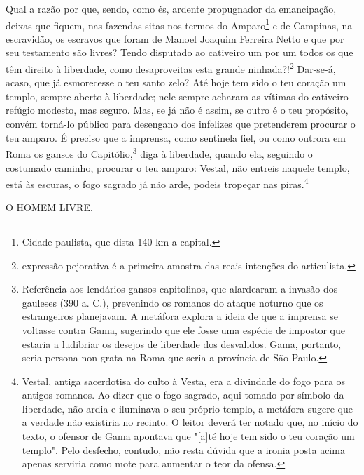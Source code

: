Qual a razão por que, sendo, como és, ardente propugnador da
emancipação, deixas que fiquem, nas fazendas sitas nos termos do
Amparo\footnote{Cidade paulista, que dista 140 km a capital.} e de
Campinas, na escravidão, os escravos que foram de Manoel Joaquim
Ferreira Netto e que por seu testamento são livres? Tendo disputado ao
cativeiro um por um todos os que têm direito à liberdade, como
desaproveitas esta grande ninhada?!\footnote{expressão pejorativa é
  a primeira amostra das reais intenções do articulista.} Dar-se-á,
acaso, que já esmorecesse o teu santo zelo? Até hoje tem sido o teu
coração um templo, sempre aberto à liberdade; nele sempre acharam as
vítimas do cativeiro refúgio modesto, mas seguro. Mas, se já não é
assim, se outro é o teu propósito, convém torná-lo público para
desengano dos infelizes que pretenderem procurar o teu amparo. É preciso
que a imprensa, como sentinela fiel, ou como outrora em Roma os gansos
do Capitólio,\footnote{Referência aos lendários gansos capitolinos,
  que alardearam a invasão dos gauleses (390 a. C.), prevenindo os
  romanos do ataque noturno que os estrangeiros planejavam. A metáfora
  explora a ideia de que a imprensa se voltasse contra Gama, sugerindo
  que ele fosse uma espécie de impostor que estaria a ludibriar os
  desejos de liberdade dos desvalidos. Gama, portanto, seria persona non
  grata na Roma que seria a província de São Paulo.} diga à liberdade,
quando ela, seguindo o costumado caminho, procurar o teu amparo: Vestal,
não entreis naquele templo, está às escuras, o fogo sagrado já não arde,
podeis tropeçar nas piras.\footnote{Vestal, antiga sacerdotisa do
  culto à Vesta, era a divindade do fogo para os antigos romanos. Ao
  dizer que o fogo sagrado, aqui tomado por símbolo da liberdade, não
  ardia e iluminava o seu próprio templo, a metáfora sugere que a
  verdade não existiria no recinto. O leitor deverá ter notado que, no
  início do texto, o ofensor de Gama apontava que "{[}a{]}té hoje tem
  sido o teu coração um templo". Pelo desfecho, contudo, não resta
  dúvida que a ironia posta acima apenas serviria como mote para
  aumentar o teor da ofensa.}

O HOMEM LIVRE.

\pagebreak
\mbox{}\vfill
\thispagestyle{empty}

